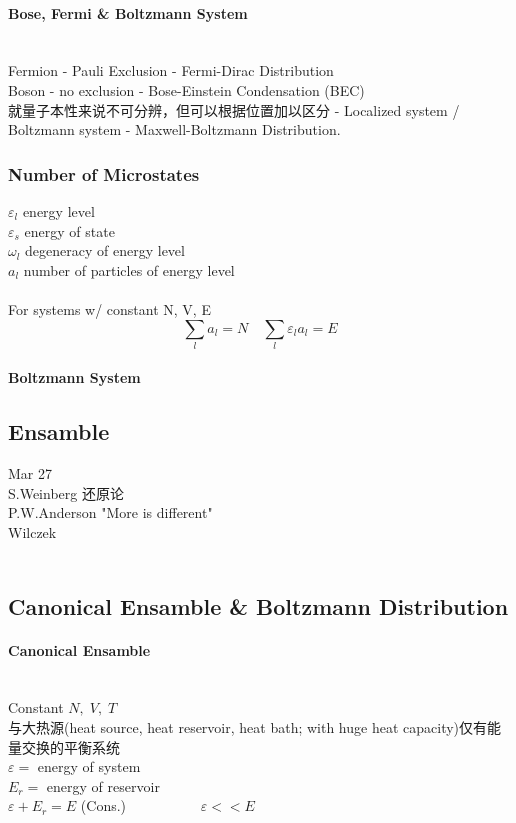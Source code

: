 \documentclass[UTF8]{ctexart} %
\numberwithin{equation}{subsection}
\begin{document}
\paragraph{Bose, Fermi \& Boltzmann System}~\\
Fermion - Pauli Exclusion - Fermi-Dirac Distribution\\
Boson - no exclusion - Bose-Einstein Condensation (BEC)\\
就量子本性来说不可分辨，但可以根据位置加以区分 - Localized system / Boltzmann system - Maxwell-Boltzmann Distribution.
\subsubsection{Number of Microstates}
$\varepsilon_l$ energy level\\
$\varepsilon_s$ energy of state\\
$\omega_l$ degeneracy of energy level\\
$a_l$ number of particles of energy level\\
~\\
For systems w/ constant N, V, E
\begin{equation}\label{key}
\sum_l a_l = N\quad \sum_l \varepsilon_l a_l = E
\end{equation}
\paragraph{Boltzmann System}

\subsection{}
\subsection{Ensamble}
\newpage
Mar 27 \\
S.Weinberg 还原论\\
P.W.Anderson "More is different"\\
Wilczek\\
~\\
\subsection{Canonical Ensamble \& Boltzmann Distribution}
\paragraph{Canonical Ensamble}~\\
Constant $N,\;V,\;T\;$\\
与大热源(heat source, heat reservoir, heat bath; with huge heat capacity)仅有能量交换的平衡系统\\
$\varepsilon =$ energy of system\\
$E_r =$ energy of reservoir\\
$\varepsilon + E_r = E $ (Cons.)
~~~~~~~~~~$\varepsilon << E$\\
\end{document}
